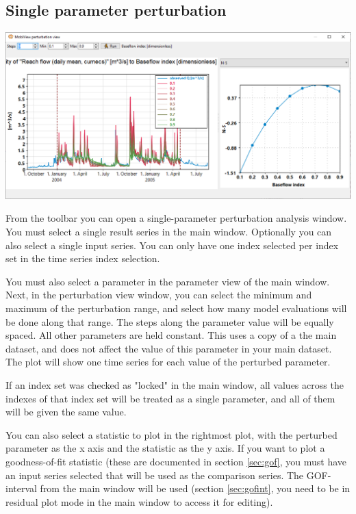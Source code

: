 \documentclass[11pt]{article}
\theoremstyle{definition}
\begin{document}
\subsection{Single parameter perturbation}

\begin{center}
\includegraphics[width=\linewidth]{img/parameterperturbation}
\end{center}

From the toolbar you can open a single-parameter perturbation analysis window. You must select a single result series in the main window. Optionally you can also select a single input series. You can only have one index selected per index set in the time series index selection.

You must also select a parameter in the parameter view of the main window. Next, in the perturbation view window, you can select the minimum and maximum of the perturbation range, and select how many model evaluations will be done along that range. The steps along the parameter value will be equally spaced. All other parameters are held constant. This uses a copy of a the main dataset, and does not affect the value of this parameter in your main dataset. The plot will show one time series for each value of the perturbed parameter.

If an index set was checked as "locked" in the main window, all values across the indexes of that index set will be treated as a single parameter, and all of them will be given the same value.

You can also select a statistic to plot in the rightmost plot, with the perturbed parameter as the x axis and the statistic as the y axis. If you want to plot a goodness-of-fit statistic (these are documented in section \ref{sec:gof}, you must have an input series selected that will be used as the comparison series. The GOF-interval from the main window will be used (section \ref{sec:gofint}, you need to be in residual plot mode in the main window to access it for editing).
\end{document}
